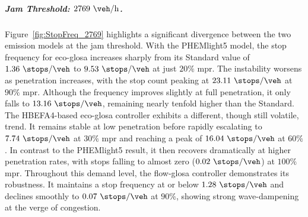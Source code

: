 \subparagraph*{Jam Threshold: $2769~\unit{\veh\per\hour}$.}
Figure~\vref{fig:StopFreq_2769} highlights a significant divergence between the two emission models at the jam threshold. With the PHEMlight5 model, the stop frequency for \ac{eco-glosa} increases sharply from its Standard value of $1.36~\unit{\stops\per\veh}$ to $9.53~\unit{\stops\per\veh}$ at just $20\%$ \ac{mpr}. The instability worsens as penetration increases, with the stop count peaking at $23.11~\unit{\stops\per\veh}$ at $90\%$ \ac{mpr}. Although the frequency improves slightly at full penetration, it only falls to $13.16~\unit{\stops\per\veh}$, remaining nearly tenfold higher than the Standard.
\mynewline
The HBEFA4-based \ac{eco-glosa} controller exhibits a different, though still volatile, trend. It remains stable at low penetration before rapidly escalating to $7.74~\unit{\stops\per\veh}$ at $30\%$ \ac{mpr} and reaching a peak of $16.04~\unit{\stops\per\veh}$ at $60\%$. In contrast to the PHEMlight5 result, it then recovers dramatically at higher penetration rates, with stops falling to almost zero ($0.02~\unit{\stops\per\veh}$) at $100\%$ \ac{mpr}.
\mynewline
Throughout this demand level, the \ac{flow-glosa} controller demonstrates its robustness. It maintains a stop frequency at or below $1.28~\unit{\stops\per\veh}$ and declines smoothly to $0.07~\unit{\stops\per\veh}$ at $90\%$, showing strong wave-dampening at the verge of congestion.

